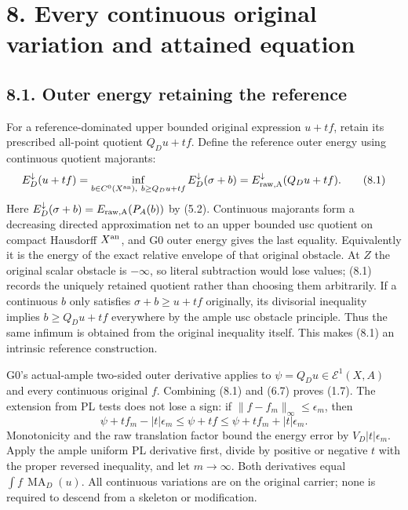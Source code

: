 \documentclass[
  10pt,
]{article}
\begin{document}
\section{8. Every continuous original variation and attained
equation}\label{every-continuous-original-variation-and-attained-equation}

\subsection{8.1. Outer energy retaining the
reference}\label{outer-energy-retaining-the-reference}

For a reference-dominated upper bounded original expression \(u+tf\),
retain its prescribed all-point quotient \(Q_Du+tf\). Define the
reference outer energy using continuous quotient majorants:
\[E_D^{\downarrow}(u+tf)
=\inf_{b\in C^0(X^{\rm an}),\ b\geq Q_Du+tf}
E_D^{\downarrow}(\sigma+b)
=E_{\rm raw,A}^{\downarrow}(Q_Du+tf).\tag{8.1}\] Here
\(E_D^{\downarrow}(\sigma+b)=E_{\rm raw,A}(P_A(b))\) by (5.2).
Continuous majorants form a decreasing directed approximation net to an
upper bounded usc quotient on compact Hausdorff \(X^{\rm an}\), and G0
outer energy gives the last equality. Equivalently it is the energy of
the exact relative envelope of that original obstacle. At \(Z\) the
original scalar obstacle is \(-\infty\), so literal subtraction would
lose values; (8.1) records the uniquely retained quotient rather than
choosing them arbitrarily. If a continuous \(b\) only satisfies
\(\sigma+b\geq u+tf\) originally, its divisorial inequality implies
\(b\geq Q_Du+tf\) everywhere by the ample usc obstacle principle. Thus
the same infimum is obtained from the original inequality itself. This
makes (8.1) an intrinsic reference construction.

G0's actual-ample two-sided outer derivative applies to
\(\psi=Q_Du\in\mathcal E^1(X,A)\) and every continuous original \(f\).
Combining (8.1) and (6.7) proves (1.7). The extension from PL tests does
not lose a sign: if \(\|f-f_m\|_\infty\leq\epsilon_m\), then
\[\psi+tf_m-|t|\epsilon_m\leq\psi+tf\leq\psi+tf_m+|t|\epsilon_m.\]
Monotonicity and the raw translation factor bound the energy error by
\(V_D|t|\epsilon_m\). Apply the ample uniform PL derivative first,
divide by positive or negative \(t\) with the proper reversed
inequality, and let \(m\to\infty\). Both derivatives equal
\(\int f\,\operatorname{MA}_D(u)\). All continuous variations are on the
original carrier; none is required to descend from a skeleton or
modification.
\end{document}
